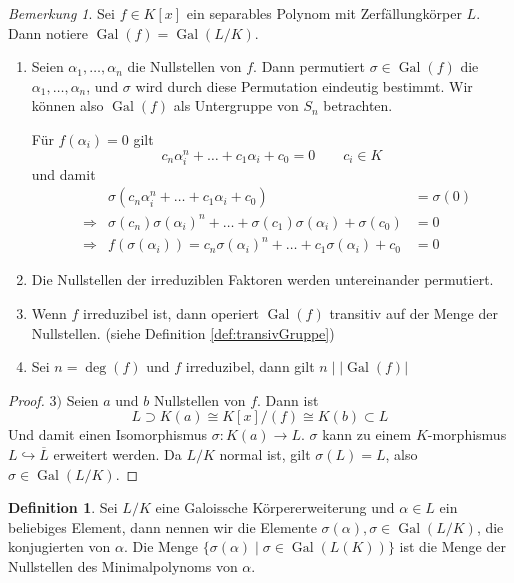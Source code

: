 \documentclass[12pt,parskip=full]{scrartcl}
\newcommand{\abs}[1]{{\left| #1 \right|}}
\newcommand{\heading}{\underline}
\DeclareMathOperator{\Gal}{Gal}
\theoremstyle{definition}
\newtheorem{definition}[theorem]{Definition}
\theoremstyle{remark}
\newtheorem*{remark}{Bemerkung}
\begin{document}
	\begin{remark}
		Sei $f \in K[x]$ ein separables Polynom mit Zerfällungkörper $L$. Dann notiere $\Gal(f) = \Gal(L/K)$.
		\begin{enumerate}
			\item Seien $\alpha_1, \dots, \alpha_n$ die Nullstellen von $f$. Dann permutiert $\sigma \in \Gal(f)$ die $\alpha_1, \dots, \alpha_n$, und $\sigma$ wird durch diese Permutation eindeutig bestimmt. Wir können also $\Gal(f)$ als Untergruppe von $S_n$ betrachten.
			
			Für $f(\alpha_i) = 0$ gilt
			\begin{equation*}
				c_n \alpha_i^n + \dots + c_1 \alpha_i + c_0 = 0 \qquad c_i \in K
			\end{equation*}
			und damit
			\begin{align*}
				&&\sigma(c_n \alpha_i^n + \dots + c_1 \alpha_i + c_0) &= \sigma(0) \\
				&\Rightarrow& \sigma(c_n) \sigma(\alpha_i)^n + \dots + \sigma(c_1) \sigma(\alpha_i) + \sigma(c_0) &= 0 \\
				&\Rightarrow& f(\sigma(\alpha_i)) =  c_n \sigma(\alpha_i)^n + \dots + c_1 \sigma(\alpha_i) + c_0 &= 0
			\end{align*}
			\item Die Nullstellen der irreduziblen Faktoren werden untereinander permutiert.
			\item Wenn $f$ irreduzibel ist, dann operiert $\Gal(f)$ transitiv auf der Menge der Nullstellen. (siehe Definition \ref{def:transivGruppe})
			\item Sei $n = \deg(f)$ und $f$ irreduzibel, dann gilt $n \mid \abs{\Gal(f)}$
		\end{enumerate}
	\end{remark}

	\begin{proof}
		\heading{$3)$} Seien $a$ und $b$ Nullstellen von $f$. Dann ist \begin{equation*}
			L \supset K(a) \cong K[x]/(f) \cong K(b) \subset L
		\end{equation*}
		Und damit einen Isomorphismus $\sigma: K(a) \to L$. $\sigma$ kann zu einem $K$-morphismus $L \hookrightarrow \overline{L}$ erweitert werden. Da $L/K$ normal ist, gilt $\sigma(L) = L$, also $\sigma \in \Gal(L/K)$.
	\end{proof}

	\begin{definition}
		Sei $L/K$ eine Galoissche Körpererweiterung und $\alpha \in L$ ein beliebiges Element, dann nennen wir die Elemente $\sigma(\alpha), \sigma \in \Gal(L/K)$, die konjugierten von $\alpha$. Die Menge $\{ \sigma(\alpha) \mid \sigma \in \Gal(L(K)) \}$ ist die Menge der Nullstellen des Minimalpolynoms von $\alpha$.
	\end{definition}
\end{document}
